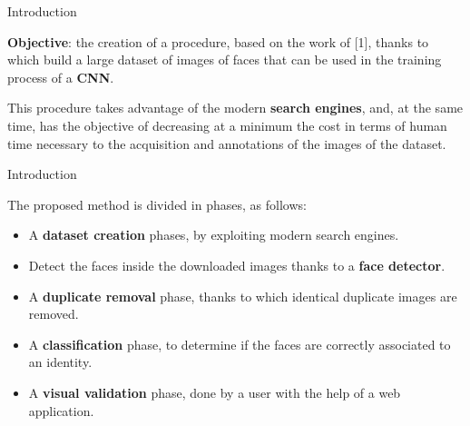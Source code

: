 \begin{tframe}{Introduction}

\textbf{Objective}: the creation of a procedure, based on the work of [1], thanks to which build a large dataset of images of faces that can be used in the training process of a \textbf{CNN}.

\vspace{0.1in}

This procedure takes advantage of the modern \textbf{search engines}, and, at the same time, has the objective of decreasing at a minimum the cost in terms of human time necessary to the acquisition and annotations of the images of the dataset.

\end{tframe}

\begin{tframe}{Introduction}

The proposed method is divided in phases, as follows:

\begin{itemize}
\item A \textbf{dataset creation} phases, by exploiting modern search engines.
\item Detect the faces inside the downloaded images thanks to a \textbf{face detector}.
\item A \textbf{duplicate removal} phase, thanks to which identical duplicate images are removed.
\item A \textbf{classification} phase, to determine if the faces are correctly associated to an identity.
\item A \textbf{visual validation} phase, done by a user with the help of a web application.
\end{itemize}

\end{tframe}